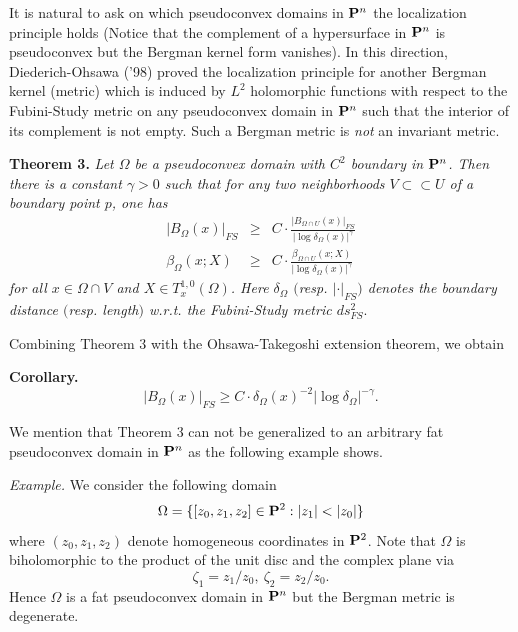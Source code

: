 \documentclass[12pt]{article}
\begin{document}
\bigskip

It is natural to ask on which pseudoconvex domains in ${\bf P}^n$
the localization principle holds (Notice that the complement of a
hypersurface in ${\bf P}^n$ is pseudoconvex but the Bergman kernel
form vanishes). In this direction, Diederich-Ohsawa ('98) proved
the localization principle for another Bergman kernel (metric)
which is induced by $L^2$ holomorphic functions with respect to
the Fubini-Study metric on any pseudoconvex domain in ${\bf P}^n$
such that the interior of its complement is not empty. Such a
Bergman metric is \emph{not} an invariant metric.

\bigskip

\textbf{Theorem 3.} \emph{Let $\Omega$ be a pseudoconvex domain
with $C^2$ boundary in ${\bf P}^n$. Then there is a constant
$\gamma>0$ such that for any two neighborhoods $V\subset\subset U$
of a boundary point $p$, one has }
\begin{eqnarray*}
|B_\Omega(x)|_{FS} & \ge & C\cdot\frac{|B_{\Omega\cap U
}(x)|_{FS}}{|\log\delta_\Omega (x)|^{\gamma}}\\
\beta_\Omega(x;X) & \ge & C\cdot\frac{\beta_{\Omega\cap U
}(x;X)}{|\log\delta_\Omega (x)|^{\gamma}}
\end{eqnarray*}
\emph{for all $x\in \Omega\cap V$ and $X\in T^{1,0}_x(\Omega)$.
Here $\delta_\Omega$ $($resp. $|\cdot|_{FS})$ denotes the boundary
distance $($resp. length$)$ w.r.t. the Fubini-Study metric
$ds_{FS}^2$}.

\bigskip

Combining Theorem 3 with the Ohsawa-Takegoshi extension theorem,
we obtain

\bigskip

\textbf{Corollary.}
$$
|B_\Omega(x)|_{FS}  \ge  C\cdot
\delta_\Omega(x)^{-2}|\log\delta_\Omega|^{-\gamma}.
$$

\bigskip

We mention that Theorem 3 can not be generalized to an arbitrary
fat pseudoconvex domain in ${\bf P}^n$ as the following example
shows.

\bigskip

\emph{Example.} We consider the following domain
$$
\Omega=\{[z_0,z_1,z_2]\in {\bf P}^2:|z_1|<|z_0|\}
$$
where $(z_0,z_1,z_2)$ denote homogeneous coordinates in ${\bf
P}^2$. Note that $\Omega$ is biholomorphic to the product of the
unit disc and the complex plane via
$$
\zeta_1=z_1/z_0,\ \zeta_2=z_2/z_0.
$$
Hence $\Omega$ is a fat pseudoconvex domain in ${\bf P}^n$ but the
Bergman metric is degenerate.
\end{document}

